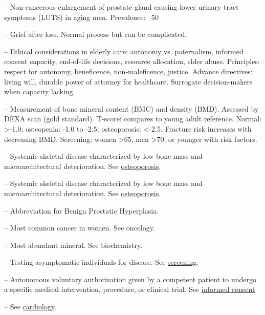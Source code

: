 -- Non-cancerous enlargement of prostate gland causing lower urinary tract symptoms (LUTS) in aging men. Prevalence: ~50%

-- Grief after loss. Normal process but can be complicated.

-- Ethical considerations in elderly care: autonomy vs. paternalism, informed consent capacity, end-of-life decisions, resource allocation, elder abuse. Principles: respect for autonomy, beneficence, non-maleficence, justice. Advance directives: living will, durable power of attorney for healthcare. Surrogate decision-makers when capacity lacking.

-- Measurement of bone mineral content (BMC) and density (BMD). Assessed by DEXA scan (gold standard). T-score: compares to young adult reference. Normal: >-1.0; osteopenia: -1.0 to -2.5; osteoporosis: <-2.5. Fracture risk increases with decreasing BMD. Screening: women >65, men >70, or younger with risk factors.

-- Systemic skeletal disease characterized by low bone mass and microarchitectural deterioration. See \hyperlink{Osteoporosis}{osteoporosis}.

-- Systemic skeletal disease characterized by low bone mass and microarchitectural deterioration. See \hyperlink{Osteoporosis}{osteoporosis}.

-- Abbreviation for Benign Prostatic Hyperplasia.

-- Most common cancer in women. See oncology.

-- Most abundant mineral. See biochemistry.

-- Testing asymptomatic individuals for disease. See \hyperlink{Screening}{screening}.

-- Autonomous voluntary authorization given by a competent patient to undergo a specific medical intervention, procedure, or clinical trial. See \hyperlink{Informed Consent}{informed consent}.

-- See \hyperlink{Cardiology}{cardiology}.

